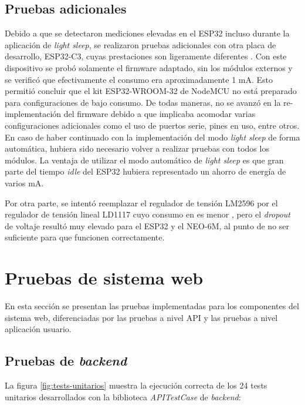 \subsection{Pruebas adicionales}

Debido a que se detectaron mediciones elevadas en el ESP32 incluso durante la aplicación de \textit{light sleep}, se realizaron pruebas adicionales con otra placa de desarrollo, ESP32-C3, cuyas prestaciones son ligeramente diferentes \citep{ESP32C3:1}. Con este dispositivo se probó solamente el firmware adaptado, sin los módulos externos y se verificó que efectivamente el consumo era aproximadamente 1 mA. Esto permitió concluir que el kit ESP32-WROOM-32 de NodeMCU no está preparado para configuraciones de bajo consumo. 
De todas maneras, no se avanzó en la re-implementación del firmware debido a que implicaba acomodar varias configuraciones adicionales como el uso de puertos serie, pines en uso, entre otros. En caso de haber continuado con la implementación del modo \textit{light sleep} de forma automática, hubiera sido necesario volver a realizar pruebas con todos los módulos. La ventaja de utilizar el modo automático de \textit{light sleep} es que gran parte del tiempo \textit{idle} del ESP32 hubiera representado un ahorro de energía de varios mA.

Por otra parte, se intentó reemplazar el regulador de tensión LM2596 por el regulador de tensión lineal LD1117 cuyo consumo en es menor \citep{LD1117:1}, pero el \textit{dropout} de voltaje resultó muy elevado para el ESP32 y el NEO-6M, al punto de no ser suficiente para que funcionen correctamente.

\section{Pruebas de sistema web}

En esta sección se presentan las pruebas implementadas para los componentes del sistema web, diferenciadas por las pruebas a nivel API y las pruebas a nivel aplicación usuario.

\subsection{Pruebas de \textit{backend}}

La figura \ref{fig:tests-unitarios} muestra la ejecución correcta de los 24 tests unitarios desarrollados con la biblioteca \textit{APITestCase} de \textit{backend}:

